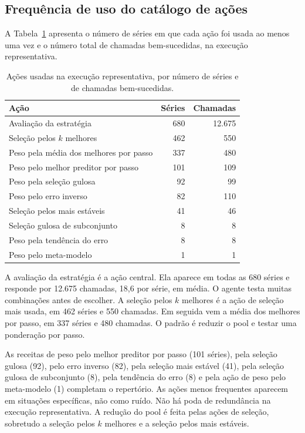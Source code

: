 \subsection{Frequência de uso do catálogo de ações}

A Tabela~\ref{tab:agente-acoes} apresenta o número de séries em que cada ação foi usada ao menos uma vez e o número total de chamadas bem-sucedidas, na execução representativa.

\begin{table}[H]
\centering
\caption{Ações usadas na execução representativa, por número de séries e de chamadas bem-sucedidas.}
\label{tab:agente-acoes}
\begin{tabular}{@{}lrr@{}}
\toprule
\textbf{Ação} & \textbf{Séries} & \textbf{Chamadas} \\
\midrule
Avaliação da estratégia & 680 & 12.675 \\
Seleção pelos $k$ melhores & 462 & 550 \\
Peso pela média dos melhores por passo & 337 & 480 \\
Peso pelo melhor preditor por passo & 101 & 109 \\
Peso pela seleção gulosa & 92 & 99 \\
Peso pelo erro inverso & 82 & 110 \\
Seleção pelos mais estáveis & 41 & 46 \\
Seleção gulosa de subconjunto & 8 & 8 \\
Peso pela tendência do erro & 8 & 8 \\
Peso pelo meta-modelo & 1 & 1 \\
\bottomrule
\end{tabular}
\end{table}

A avaliação da estratégia é a ação central. Ela aparece em todas as 680 séries e responde por 12.675 chamadas, 18,6 por série, em média. O agente testa muitas combinações antes de escolher. A seleção pelos $k$ melhores é a ação de seleção mais usada, em 462 séries e 550 chamadas. Em seguida vem a média dos melhores por passo, em 337 séries e 480 chamadas. O padrão é reduzir o pool e testar uma ponderação por passo.

As receitas de peso pelo melhor preditor por passo (101 séries), pela seleção gulosa (92), pelo erro inverso (82), pela seleção mais estável (41), pela seleção gulosa de subconjunto (8), pela tendência do erro (8) e pela ação de peso pelo meta-modelo (1) completam o repertório. As ações menos frequentes aparecem em situações específicas, não como ruído. Não há poda de redundância na execução representativa. A redução do pool é feita pelas ações de seleção, sobretudo a seleção pelos $k$ melhores e a seleção pelos mais estáveis.


